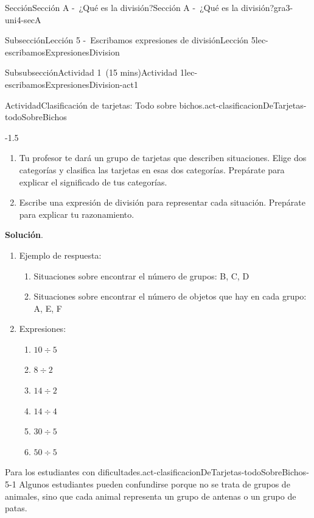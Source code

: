 \documentclass[oneside,10pt,]{article}
\newcommand{\blocktitlefont}{\relax}
\begin{document}
\begin{sectionptx}{Sección}{Sección A -~¿Qué es la división?}{}{Sección A -~¿Qué es la división?}{}{}{gra3-uni4-secA}
\begin{subsectionptx}{Subsección}{Lección 5 -~Escribamos expresiones de división}{}{Lección 5}{}{}{lec-escribamosExpresionesDivision}
\begin{subsubsectionptx}{Subsubsección}{Actividad 1~(15 mins)}{}{Actividad 1}{}{}{lec-escribamosExpresionesDivision-act1}
\begin{activity}{Actividad}{Clasificación de tarjetas: Todo sobre bichos.}{act-clasificacionDeTarjetas-todoSobreBichos}
\begin{image}{0.3}{0.4}{0.3}{-1.5\baselineskip}
\end{image}%
%
\begin{enumerate}
\item{}Tu profesor te dará un grupo de tarjetas que describen situaciones. Elige dos categorías y clasifica las tarjetas en esas dos categorías. Prepárate para explicar el significado de tus categorías.%
\item{}Escribe una expresión de división para representar cada situación. Prepárate para explicar tu razonamiento.%
\end{enumerate}
\par\smallskip%
\noindent\textbf{\blocktitlefont Solución}.\hypertarget{act-clasificacionDeTarjetas-todoSobreBichos-3}{}\quad{}%
\begin{enumerate}
\item{}Ejemplo de respuesta:%
%
\begin{enumerate}
\item{}Situaciones sobre encontrar el número de grupos: B, C, D%
\item{}Situaciones sobre encontrar el número de objetos que hay en cada grupo: A, E, F%
\end{enumerate}
\item{}Expresiones:%
\begin{enumerate}[label={\Alph*.}]
\item{}\(\displaystyle 10\div 5\)%
\item{}\(\displaystyle 8\div 2\)%
\item{}\(\displaystyle 14\div 2\)%
\item{}\(\displaystyle 14\div 4\)%
\item{}\(\displaystyle 30\div 5\)%
\item{}\(\displaystyle 50\div 5\)%
\end{enumerate}
%
\end{enumerate}
\end{activity}%
%
%
\par
\begin{paragraphs}{Para los estudiantes con dificultades.}{act-clasificacionDeTarjetas-todoSobreBichos-5-1}%
Algunos estudiantes pueden confundirse porque no se trata de grupos de animales, sino que cada animal representa un grupo de antenas o un grupo de patas.%

\end{paragraphs}
\end{subsubsectionptx}
\end{subsectionptx}
\end{sectionptx}
\end{document}
